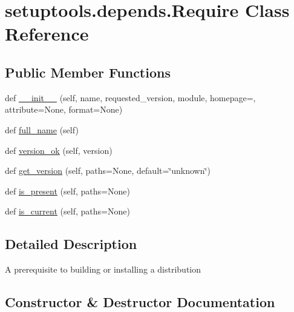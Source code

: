 \hypertarget{classsetuptools_1_1depends_1_1Require}{}\section{setuptools.\+depends.\+Require Class Reference}
\label{classsetuptools_1_1depends_1_1Require}
\subsection*{Public Member Functions}
\begin{DoxyCompactItemize}
\item 
def \hyperlink{classsetuptools_1_1depends_1_1Require_ad6f42643730b7c327b4c28ed4c675899}{\+\_\+\+\_\+init\+\_\+\+\_\+} (self, name, requested\+\_\+version, module, homepage=\textquotesingle{}\textquotesingle{}, attribute=None, format=None)
\item 
def \hyperlink{classsetuptools_1_1depends_1_1Require_aafeb6a0853fe7b53c649a90b4860aa1b}{full\+\_\+name} (self)
\item 
def \hyperlink{classsetuptools_1_1depends_1_1Require_ae09a6a0a9d85091433a92026a2540e27}{version\+\_\+ok} (self, version)
\item 
def \hyperlink{classsetuptools_1_1depends_1_1Require_aa726406933884cdfc0a0a13b01920734}{get\+\_\+version} (self, paths=None, default=\char`\"{}unknown\char`\"{})
\item 
def \hyperlink{classsetuptools_1_1depends_1_1Require_a69771b02a8e6f6aee88cf1e9dfa0b6d4}{is\+\_\+present} (self, paths=None)
\item 
def \hyperlink{classsetuptools_1_1depends_1_1Require_aca429ced44bae94f3ff8af55745d60ed}{is\+\_\+current} (self, paths=None)
\end{DoxyCompactItemize}


\subsection{Detailed Description}
\begin{DoxyVerb}A prerequisite to building or installing a distribution\end{DoxyVerb}
 

\subsection{Constructor \& Destructor Documentation}
\mbox{\label{classsetuptools_1_1depends_1_1Require_ad6f42643730b7c327b4c28ed4c675899}} 
